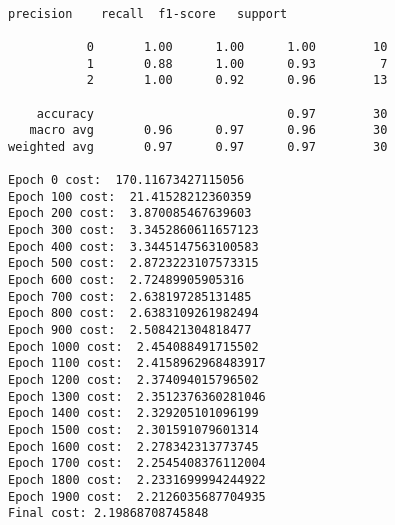 \documentclass[11pt]{article}
\begin{document}
    \begin{center}
    \end{center}
    { \hspace*{\fill} \\}
    
    \begin{Verbatim}[commandchars=\\\{\}]
              precision    recall  f1-score   support

           0       1.00      1.00      1.00        10
           1       0.88      1.00      0.93         7
           2       1.00      0.92      0.96        13

    accuracy                           0.97        30
   macro avg       0.96      0.97      0.96        30
weighted avg       0.97      0.97      0.97        30

Epoch 0 cost:  170.11673427115056
Epoch 100 cost:  21.41528212360359
Epoch 200 cost:  3.870085467639603
Epoch 300 cost:  3.3452860611657123
Epoch 400 cost:  3.3445147563100583
Epoch 500 cost:  2.8723223107573315
Epoch 600 cost:  2.72489905905316
Epoch 700 cost:  2.638197285131485
Epoch 800 cost:  2.6383109261982494
Epoch 900 cost:  2.508421304818477
Epoch 1000 cost:  2.454088491715502
Epoch 1100 cost:  2.4158962968483917
Epoch 1200 cost:  2.374094015796502
Epoch 1300 cost:  2.3512376360281046
Epoch 1400 cost:  2.329205101096199
Epoch 1500 cost:  2.301591079601314
Epoch 1600 cost:  2.278342313773745
Epoch 1700 cost:  2.2545408376112004
Epoch 1800 cost:  2.2331699994244922
Epoch 1900 cost:  2.2126035687704935
Final cost: 2.19868708745848

    \end{Verbatim}

    \begin{center}
    \end{center}
    { \hspace*{\fill} \\}
    
\end{document}
